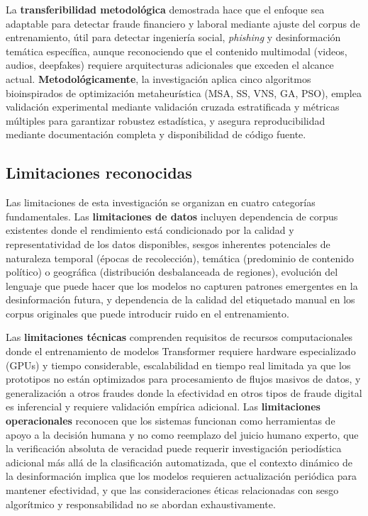 La \textbf{transferibilidad metodológica} demostrada hace que el enfoque sea adaptable para detectar fraude financiero y laboral mediante ajuste del corpus de entrenamiento, útil para detectar ingeniería social, \textit{phishing} y desinformación temática específica, aunque reconociendo que el contenido multimodal (videos, audios, deepfakes) requiere arquitecturas adicionales que exceden el alcance actual. \textbf{Metodológicamente}, la investigación aplica cinco algoritmos bioinspirados de optimización metaheurística (MSA, SS, VNS, GA, PSO), emplea validación experimental mediante validación cruzada estratificada y métricas múltiples para garantizar robustez estadística, y asegura reproducibilidad mediante documentación completa y disponibilidad de código fuente.

\subsection{Limitaciones reconocidas}

Las limitaciones de esta investigación se organizan en cuatro categorías fundamentales. Las \textbf{limitaciones de datos} incluyen dependencia de corpus existentes donde el rendimiento está condicionado por la calidad y representatividad de los datos disponibles, sesgos inherentes potenciales de naturaleza temporal (épocas de recolección), temática (predominio de contenido político) o geográfica (distribución desbalanceada de regiones), evolución del lenguaje que puede hacer que los modelos no capturen patrones emergentes en la desinformación futura, y dependencia de la calidad del etiquetado manual en los corpus originales que puede introducir ruido en el entrenamiento.

Las \textbf{limitaciones técnicas} comprenden requisitos de recursos computacionales donde el entrenamiento de modelos Transformer requiere hardware especializado (GPUs) y tiempo considerable, escalabilidad en tiempo real limitada ya que los prototipos no están optimizados para procesamiento de flujos masivos de datos, y generalización a otros fraudes donde la efectividad en otros tipos de fraude digital es inferencial y requiere validación empírica adicional. Las \textbf{limitaciones operacionales} reconocen que los sistemas funcionan como herramientas de apoyo a la decisión humana y no como reemplazo del juicio humano experto, que la verificación absoluta de veracidad puede requerir investigación periodística adicional más allá de la clasificación automatizada, que el contexto dinámico de la desinformación implica que los modelos requieren actualización periódica para mantener efectividad, y que las consideraciones éticas relacionadas con sesgo algorítmico y responsabilidad no se abordan exhaustivamente.

